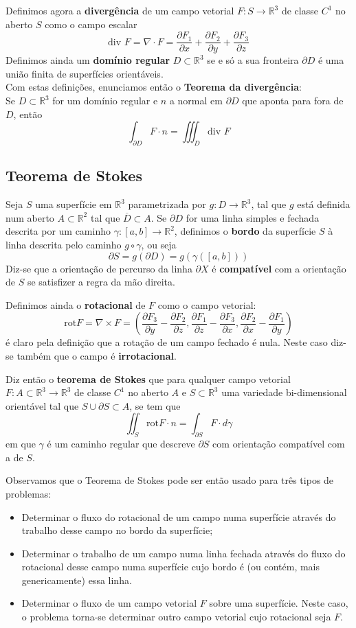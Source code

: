 \documentclass{article}
\newcommand{\R}{\mathbb{R}}
\begin{document}
Definimos agora a \textbf{divergência} de um campo vetorial $F: S \to \R^3$ de classe $C^1$ no aberto $S$ como o campo escalar
$$ \text{div } F = \nabla \cdot F = \frac{\partial F_1}{\partial x} + \frac{\partial F_2}{\partial y} + \frac{\partial F_3}{\partial z} $$
Definimos ainda um \textbf{domínio regular} $D \subset \R^3$ se e só a sua fronteira $\partial D$ é uma união finita de superfícies orientáveis.\\
Com estas definições, enunciamos então o \textbf{Teorema da divergência}:\\
Se $D \subset \R^3$ for um domínio regular e $n$ a normal em $\partial D$ que aponta para fora de $D$, então
$$ \int_{\partial D} F \cdot n = \iiint_D \text{div } F $$

\subsection{Teorema de Stokes}
Seja $S$ uma superfície em $\R^3$ parametrizada por $g: D \to \R^3$, tal que $g$ está definida num aberto $A \subset \R^2$ tal que $\overline{D} \subset A$. Se $\partial D$ for uma linha simples e fechada descrita por um caminho $\gamma: [a,b] \to \R^2$, definimos o \textbf{bordo} da superfície $S$ à linha descrita pelo caminho $g \circ \gamma$, ou seja
$$ \partial S = g(\partial D) = g(\gamma([a,b])) $$
Diz-se que a orientação de percurso da linha $\partial X$ é \textbf{compatível} com a orientação de $S$ se satisfizer a regra da mão direita.

Definimos ainda o \textbf{rotacional} de $F$ como o campo vetorial:
$$ \text{rot} F = \nabla \times F = \left( 
\frac{\partial F_3}{\partial y} - \frac{\partial F_2}{\partial z},
\frac{\partial F_1}{\partial z} - \frac{\partial F_3}{\partial x},
\frac{\partial F_2}{\partial x} - \frac{\partial F_1}{\partial y} 
\right) $$
é claro pela definição que a rotação de um campo fechado é nula. Neste caso diz-se também que o campo é \textbf{irrotacional}.

Diz então o \textbf{teorema de Stokes} que para qualquer campo vetorial $F: A \subset \R^3 \to \R^3$ de classe $C^1$ no aberto $A$ e $S \subset \R^3$ uma variedade bi-dimensional orientável tal que $S \cup \partial S \subset A$, se tem que
$$ \iint_S \text{rot} F \cdot n = \int_{\partial S} F \cdot d \gamma $$
em que $\gamma$ é um caminho regular que descreve $\partial S$ com orientação compatível com a de $S$.

Observamos que o Teorema de Stokes pode ser então usado para três tipos de problemas:
\begin{itemize}
	\item Determinar o fluxo do rotacional de um campo numa superfície através do trabalho desse campo no bordo da superfície;
	\item Determinar o trabalho de um campo numa linha fechada através do fluxo do rotacional desse campo numa superfície cujo bordo é (ou contém, mais genericamente) essa linha.
	\item Determinar o fluxo de um campo vetorial $F$ sobre uma superfície. Neste caso, o problema torna-se determinar outro campo vetorial cujo rotacional seja $F$.
\end{itemize}
\end{document}
